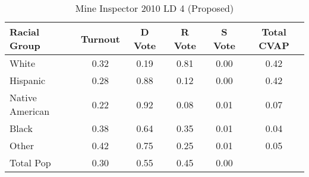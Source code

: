 \begin{table}[htb]
\begin{center}
\caption{Mine Inspector 2010 LD 4 (Proposed)}
\label{smine_cvap_ld_4}
\begin{tabular}{lccccc}
  \hline
Racial Group & Turnout & D Vote & R Vote & S Vote & Total CVAP \\ 
  \hline
White & 0.32 & 0.19 & 0.81 & 0.00 & 0.42 \\ 
  Hispanic & 0.28 & 0.88 & 0.12 & 0.00 & 0.42 \\ 
  Native American & 0.22 & 0.92 & 0.08 & 0.01 & 0.07 \\ 
  Black & 0.38 & 0.64 & 0.35 & 0.01 & 0.04 \\ 
  Other & 0.42 & 0.75 & 0.25 & 0.01 & 0.05 \\ 
  Total Pop & 0.30 & 0.55 & 0.45 & 0.00 &  \\ 
   \hline
\end{tabular}
\end{center}
\end{table}

